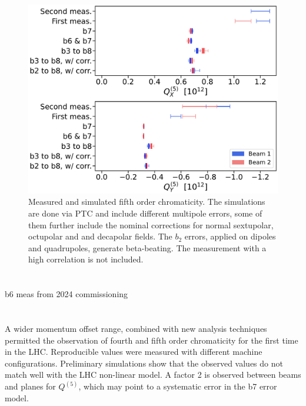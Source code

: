 \begin{figure}[tbh]
    \centering
    \includegraphics[width=1\columnwidth]{images/MOPL027_f4-1.pdf}
    \caption{Measured and simulated fifth order chromaticity. 
             The simulations are done via PTC and include different multipole errors, some of them further
             include the nominal corrections for normal sextupolar, octupolar and and decapolar fields.
             The $b_2$ errors, applied on dipoles and quadrupoles, generate beta-beating.
             The measurement with a high correlation is not included.}
    \label{beam1_q5x_ptc}
\end{figure}




\section{}

b6 meas from 2024 commissioning




\section{}

A wider momentum offset range, combined with new analysis techniques permitted the observation of fourth and fifth order chromaticity for the first time in the LHC. Reproducible values were measured with different machine configurations.
Preliminary simulations show that the observed values do not match well with the LHC non-linear model. A factor 2 is observed between beams and planes for $Q^{(5)}$, which may point to a systematic error in the b7 error model.

